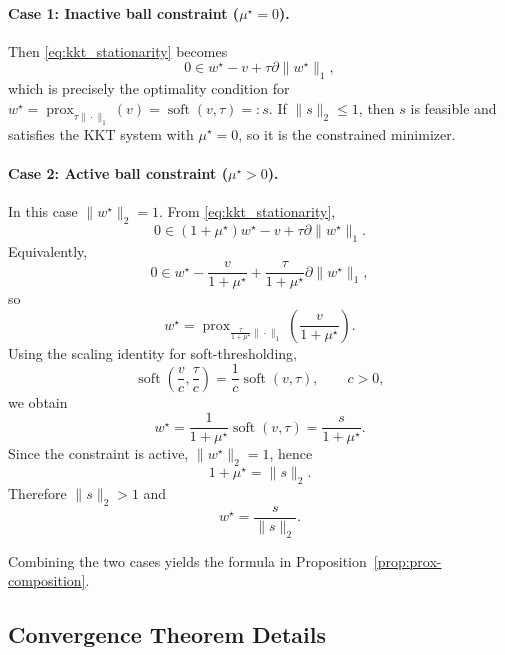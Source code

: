 \documentclass[10pt,twocolumn,letterpaper]{article}
\theoremstyle{definition}
\DeclareMathOperator{\prox}{prox}
\DeclareMathOperator{\soft}{soft}
\begin{document}
\paragraph{Case 1: Inactive ball constraint (\texorpdfstring{$\mu^\star=0$}{mu=0}).}
Then \eqref{eq:kkt_stationarity} becomes
\begin{equation}
0 \in w^\star-v+\tau\partial\|w^\star\|_1,
\end{equation}
which is precisely the optimality condition for $w^\star=\prox_{\tau\|\cdot\|_1}(v)=\soft(v,\tau)=:s$. If $\|s\|_2\le 1$, then $s$ is feasible and satisfies the KKT system with $\mu^\star=0$, so it is the constrained minimizer.

\paragraph{Case 2: Active ball constraint (\texorpdfstring{$\mu^\star>0$}{mu>0}).}
In this case $\|w^\star\|_2=1$. From \eqref{eq:kkt_stationarity},
\begin{equation}
0 \in (1+\mu^\star)w^\star - v + \tau \partial\|w^\star\|_1.
\end{equation}
Equivalently,
\begin{equation}
0 \in w^\star - \frac{v}{1+\mu^\star} + \frac{\tau}{1+\mu^\star}\partial\|w^\star\|_1,
\end{equation}
so
\begin{equation}
w^\star = \prox_{\frac{\tau}{1+\mu^\star}\|\cdot\|_1}\!\left(\frac{v}{1+\mu^\star}\right).
\end{equation}
Using the scaling identity for soft-thresholding,
\begin{equation}
\soft\!\left(\frac{v}{c},\frac{\tau}{c}\right)=\frac{1}{c}\soft(v,\tau), \qquad c>0,
\end{equation}
we obtain
\begin{equation}
w^\star=\frac{1}{1+\mu^\star}\soft(v,\tau)=\frac{s}{1+\mu^\star}.
\end{equation}
Since the constraint is active, $\|w^\star\|_2=1$, hence
\begin{equation}
1+\mu^\star=\|s\|_2.
\end{equation}
Therefore $\|s\|_2>1$ and
\begin{equation}
w^\star=\frac{s}{\|s\|_2}.
\end{equation}

Combining the two cases yields the formula in Proposition~\ref{prop:prox-composition}.

\subsection{Convergence Theorem Details}
\end{document}
